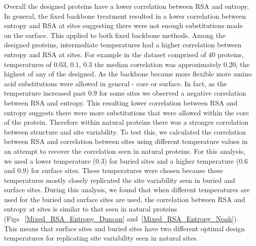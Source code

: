 \documentclass[12pt]{article}
\begin{document}
{Overall the designed proteins have a lower correlation between RSA and entropy.  In general, the fixed backbone treatment resulted in a lower correlation between entropy and RSA at sites suggesting there were not enough substitutions made on the surface.  This applied to both fixed backbone methods. Among the designed proteins, intermediate temperatures had a higher correlation between entropy and RSA at sites. For example in the dataset comprised of 40 proteins, temperatures of 0.03, 0.1, 0.3 the median correlation was approximately 0.20, the highest of any of the designed. As the backbone became more flexible more amino acid substitutions were allowed in general - core or surface. In fact, as the temperature increased past 0.9 for some sites we observed a negative correlation between RSA and entropy.  This resulting lower correlation between RSA and entropy suggests there were more substitutions that were allowed within the core of the protein. Therefore within natural proteins there was a stronger correlation between structure and site variability.  To test this, we calculated the correlation between RSA and correlation between sites using different temperature values in an attempt to recover the correlation seen in natural proteins. For this analysis, we used a lower temperature (0.3) for buried sites and a higher temperature (0.6 and 0.9) for surface sites. These temperatures were chosen because these temperatures mostly closely replicated the site variability seen in buried and surface sites. During this analysis, we found that when different temperatures are used for the buried and surface sites are used, the correlation between RSA and entropy at sites is similar to that seen in natural proteins (Figs.~\ref{Mixed_RSA_Entropy_Duncan} and~\ref{Mixed_RSA_Entropy_Noah}). This means that surface sites and buried sites have two different optimal design temperatures for replicating site variability seen in natural sites. 




}
\end{document}
